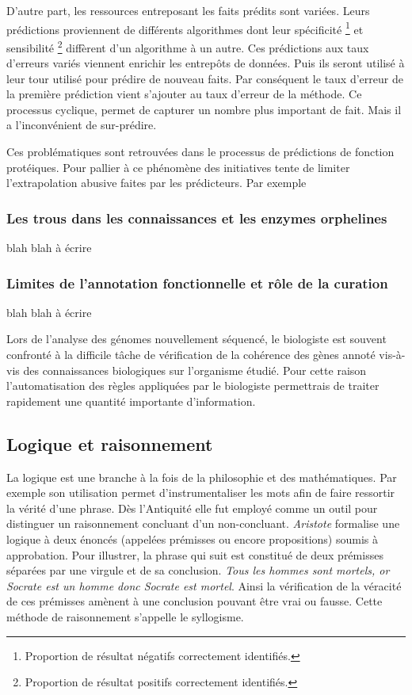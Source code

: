 \begin{refsegment}
    D’autre part, les ressources entreposant les faits prédits sont variées. Leurs prédictions proviennent  de différents algorithmes dont leur spécificité \footnote{Proportion de résultat négatifs correctement identifiés.} et sensibilité \footnote{Proportion de résultat positifs correctement identifiés.} diffèrent d’un algorithme à un autre. Ces prédictions aux taux d’erreurs variés viennent enrichir les entrepôts de données. Puis ils seront utilisé à leur tour utilisé pour prédire de nouveau faits. Par conséquent  le taux d’erreur de la première prédiction vient s’ajouter au taux d’erreur de la méthode. Ce processus cyclique, permet de capturer un nombre plus important de fait. Mais il a l’inconvénient de sur-prédire.
    
    Ces problématiques sont retrouvées dans le processus de prédictions de fonction protéiques.
    Pour pallier à ce phénomène des initiatives tente de limiter l’extrapolation abusive faites par les prédicteurs. Par exemple \citeauthor{pfeiffer2015manual}
    
    
    \subsubsection{Les trous dans les connaissances et les enzymes orphelines}
    
    blah blah à écrire
    
    \subsubsection{Limites de l’annotation fonctionnelle et rôle de la curation}
    
    blah blah à écrire
    
    Lors de l'analyse des génomes nouvellement séquencé, le biologiste est souvent confronté à la difficile tâche de vérification de la cohérence des gènes annoté vis-à-vis des connaissances biologiques sur l'organisme étudié. Pour cette raison l'automatisation des règles appliquées par le biologiste permettrais de traiter rapidement une quantité importante d'information.
    
    \subsection{Logique et raisonnement}
    
    La logique est une branche à la fois de la philosophie et des mathématiques. Par exemple son utilisation permet d'instrumentaliser les mots afin de faire ressortir la vérité d'une phrase. Dès l'Antiquité elle fut employé comme un outil pour distinguer un raisonnement concluant d'un non-concluant. \textit{Aristote} formalise une logique à deux énoncés (appelées prémisses ou encore propositions) soumis à approbation. Pour illustrer, la phrase qui suit est constitué de deux prémisses séparées par une virgule et de sa conclusion. \textit{Tous les hommes sont mortels, or Socrate est un homme donc Socrate est mortel}. Ainsi la vérification de la véracité de ces prémisses amènent à une conclusion pouvant être vrai ou fausse. Cette méthode de raisonnement s'appelle le syllogisme.
    

\end{refsegment}
